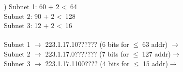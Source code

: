 \documentclass[12pt]{report}
\begin{document}
\pagebreak
{}) Subnet 1: 60 + 2 \textless\ 64\\
Subnet 2: 90 + 2 \textless\ 128\\
Subnet 3: 12 + 2 \textless\ 16\\
\noindent\\
Subnet 1 $\rightarrow$ 223.1.17.10?????? (6 bits for $\leq\;$63 addr) $\rightarrow$ \\
Subnet 2 $\rightarrow$ 223.1.17.0??????? (7 bits for $\leq\;$127 addr)$\rightarrow$ \\
Subnet 3 $\rightarrow$ 223.1.17.1100???? (4 bits for $\leq\;$15 addr)$\rightarrow$ 
\end{document}
